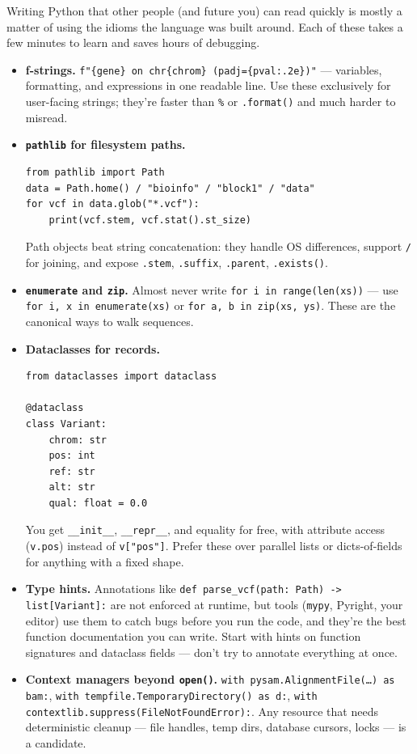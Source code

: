 Writing Python that other people (and future you) can read quickly is mostly a matter of using the idioms the language was built around. Each of these takes a few minutes to learn and saves hours of debugging.
\begin{itemize}[nosep]
  \item \textbf{f-strings.} \texttt{f"\{gene\} on chr\{chrom\} (padj=\{pval:.2e\})"} --- variables, formatting, and expressions in one readable line. Use these exclusively for user-facing strings; they're faster than \texttt{\%} or \texttt{.format()} and much harder to misread.
  \item \textbf{\texttt{pathlib} for filesystem paths.}
    \begin{lstlisting}
from pathlib import Path
data = Path.home() / "bioinfo" / "block1" / "data"
for vcf in data.glob("*.vcf"):
    print(vcf.stem, vcf.stat().st_size)
    \end{lstlisting}
    Path objects beat string concatenation: they handle OS differences, support \texttt{/} for joining, and expose \texttt{.stem}, \texttt{.suffix}, \texttt{.parent}, \texttt{.exists()}.
  \item \textbf{\texttt{enumerate} and \texttt{zip}.} Almost never write \texttt{for i in range(len(xs))} --- use \texttt{for i, x in enumerate(xs)} or \texttt{for a, b in zip(xs, ys)}. These are the canonical ways to walk sequences.
  \item \textbf{Dataclasses for records.}
    \begin{lstlisting}
from dataclasses import dataclass

@dataclass
class Variant:
    chrom: str
    pos: int
    ref: str
    alt: str
    qual: float = 0.0
    \end{lstlisting}
    You get \texttt{\_\_init\_\_}, \texttt{\_\_repr\_\_}, and equality for free, with attribute access (\texttt{v.pos}) instead of \texttt{v["pos"]}. Prefer these over parallel lists or dicts-of-fields for anything with a fixed shape.
  \item \textbf{Type hints.} Annotations like \texttt{def parse\_vcf(path: Path) -> list[Variant]:} are not enforced at runtime, but tools (\texttt{mypy}, Pyright, your editor) use them to catch bugs before you run the code, and they're the best function documentation you can write. Start with hints on function signatures and dataclass fields --- don't try to annotate everything at once.
  \item \textbf{Context managers beyond \texttt{open()}.} \texttt{with pysam.AlignmentFile(\ldots) as bam:}, \texttt{with tempfile.TemporaryDirectory() as d:}, \texttt{with contextlib.suppress(FileNotFoundError):}. Any resource that needs deterministic cleanup --- file handles, temp dirs, database cursors, locks --- is a candidate.
\end{itemize}
